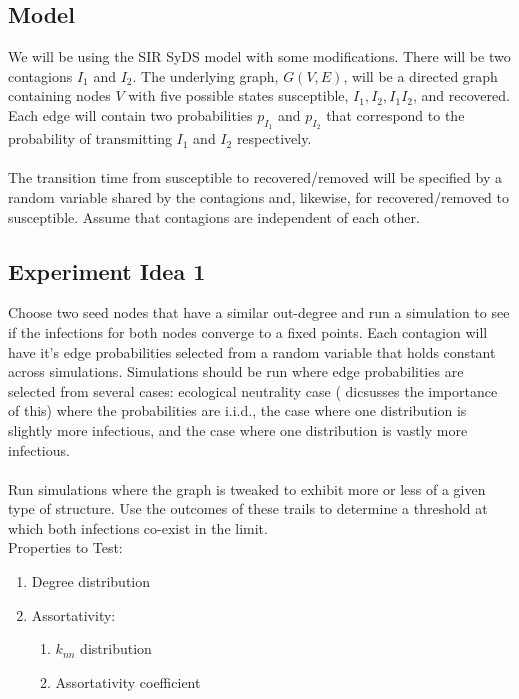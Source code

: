 \documentclass[11pt]{article}
\begin{document}
\subsection{Model}
    We will be using the SIR SyDS model with some modifications. There will be two
    contagions $I_{1}$ and $I_{2}$. The underlying graph, $G(V,E)$, will be a directed graph
    containing nodes $V$ with five possible states susceptible, $I_{1}, I_{2}, I_{1}I_{2}$, and recovered. Each edge will contain two probabilities $p_{I_{1}}$ and $p_{I_{2}}$ that correspond to the probability of transmitting $I_{1}$ and $I_{2}$ respectively. \\ \\ 
    The transition time from susceptible to recovered/removed will be specified by a random variable shared by the contagions and, likewise, for recovered/removed to susceptible. Assume that contagions are independent of each other.
\subsection{Experiment Idea 1}
    Choose two seed nodes that have a similar out-degree and run a simulation to see if the infections for both nodes
    converge to a fixed points. Each contagion will have it's edge probabilities selected from a random variable that holds constant across simulations. Simulations should be run where edge probabilities are selected from several cases: ecological neutrality case (\cite{LIPSITCH20092} dicsusses the importance of this) where the probabilities are i.i.d., the case where one distribution is slightly more infectious, and the case where one distribution is vastly more infectious.
    \\ \\
    Run simulations where the graph is tweaked  to exhibit more or less of a given type of structure. Use the outcomes of these trails to determine a threshold at which both infections co-exist in the limit. \\
    Properties to Test:
    \begin{enumerate}
        \item Degree distribution
        \item Assortativity:
        \begin{enumerate}
            \item $k_{nn}$ distribution
            \item Assortativity coefficient
        \end{enumerate}
    \end{enumerate}
\end{document}
